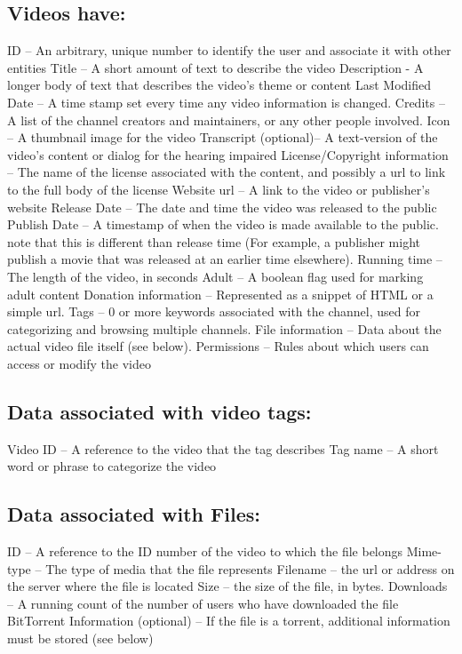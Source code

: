 \documentclass[a4paper,12pt]{report}
\begin{document}
\subsection{Videos have:}
ID – An arbitrary, unique number to identify the user and associate it with other entities 
Title – A short amount of text to describe the video
Description - A longer body of text that describes the video's theme or content
Last Modified Date – A time stamp set every time any video information is changed.
Credits – A list of the channel creators and maintainers, or any other people involved. 
Icon – A thumbnail image for the video
Transcript (optional)– A text-version of the video's content or dialog for the hearing impaired
License/Copyright information – The name of the license associated with the content, and possibly a url to link to the full body of the license
Website url – A link to the video  or publisher's website
Release Date – The date and time the video was released to the public
Publish Date – A timestamp of when the video is made available to the public. note that this is different than release time (For example, a publisher might publish a movie that was released at an earlier time elsewhere).
Running time – The length of the video, in seconds
Adult – A boolean flag used for marking adult content
Donation information – Represented as a snippet of HTML or a simple url.
Tags – 0 or more keywords associated with the channel, used for categorizing and 	browsing multiple channels.
File information – Data about the actual video file itself (see below).
Permissions – Rules about which users can access or modify the video

\subsection{Data associated with video tags:}
	Video ID – A reference to the video that the tag describes
	Tag name – A short word or phrase to categorize the video

\subsection{Data associated with Files:}
ID – A reference to the ID number of the video to which the file belongs
Mime-type – The type of media that the file represents
Filename – the url or address on the server where the file is located
Size – the size of the file, in bytes.
Downloads – A running count of the number of users who have downloaded the file
BitTorrent Information (optional) – If the file is a torrent, additional information must be stored (see below)
\end{document}
